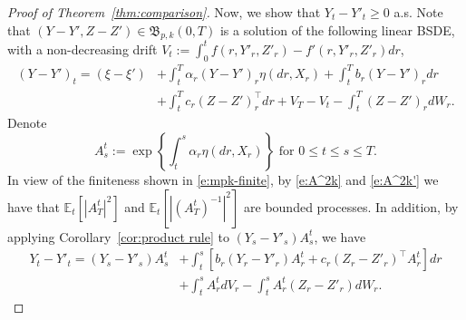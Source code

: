 \documentclass[11pt,reqno]{amsart}
\numberwithin{equation}{section}
\begin{document}
\begin{proof}[Proof of Theorem~\ref{thm:comparison}]
Now, we show that $Y_{t} - Y'_{t}\ge 0$ a.s. Note that $(Y-Y',Z-Z')\in \mathfrak{B}_{p,k}(0,T)$ is a solution of the following linear BSDE, with a non-decreasing drift $V_{t} := \int_{0}^{t} f(r,Y'_r,Z'_r) - f'(r,Y'_r,Z'_r) dr$,
\begin{equation*}
\begin{aligned}
(Y-Y')_{t} = (\xi - \xi') &+ \int_{t}^{T}\alpha_r (Y-Y')_{r}\eta(dr,X_{r}) + \int_{t}^{T}b_{r}(Y-Y')_{r}dr \\
& + \int_{t}^{T}c_{r}(Z - Z')^{\top}_{r}dr + V_{T} - V_{t} - \int_{t}^{T} (Z - Z')_r dW_r.
\end{aligned}
\end{equation*}
Denote 
\[A^{t}_s := \exp\left\{\int_{t}^{s}\alpha_{r}\eta(dr,X_r)\right\} \text{ for } 0\le t\le s\le T.\]
In view of the finiteness shown in \eqref{e:mpk-finite}, by \eqref{e:A^2k} and \eqref{e:A^2k'} we have that $\mathbb{E}_{t}[|A^{t}_{T}|^{2}]$ and $\mathbb{E}_{t}[|(A^{t}_{T})^{-1}|^{2}]$ are bounded processes. In addition, by applying Corollary~\ref{cor:product rule} to $(Y_s - Y'_s)A^{t}_{s}$, we have 
\begin{equation*}
\begin{aligned}
Y_t - Y'_t = (Y_s - Y'_s)A^{t}_{s} &+ \int_{t}^{s}\left[b_r(Y_r - Y'_r)A^{t}_{r} + c_{r} (Z_r - Z'_r)^{\top}A^{t}_r\right]dr \\
& + \int_{t}^{s}A^{t}_r dV_r - \int_{t}^{s} A^{t}_r(Z_r - Z'_r) dW_r.
\end{aligned}
\end{equation*}


\end{proof}
\end{document}
